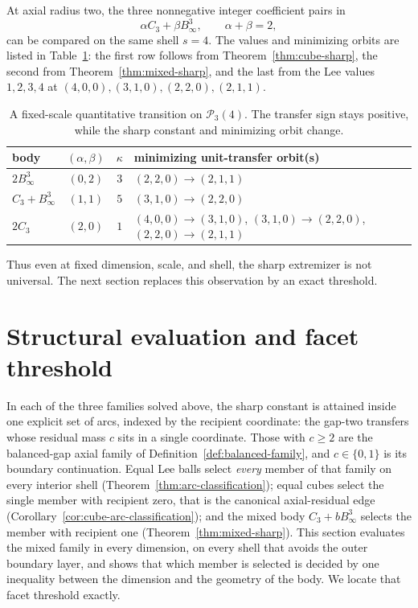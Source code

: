 \documentclass[pdflatex,sn-mathphys-num]{sn-jnl}
\theoremstyle{thmstyleone}
\theoremstyle{thmstylethree}
\theoremstyle{thmstyletwo}
\begin{document}
At axial radius two, the three nonnegative integer coefficient pairs in
\[
 \alpha C_3+\beta B_\infty^3,
 \qquad \alpha+\beta=2,
\]
can be compared on the same shell $s=4$.
The values and minimizing orbits are listed in
Table~\ref{tab:polytope-phase}: the first row follows from
Theorem~\ref{thm:cube-sharp}, the second from
Theorem~\ref{thm:mixed-sharp}, and the last from the Lee values
$1,2,3,4$ at $(4,0,0),(3,1,0),(2,2,0),(2,1,1)$.
\par
\begin{table}[ht]
\centering
\caption{A fixed-scale quantitative transition on $\mathcal P_3(4)$.  The
transfer sign stays positive, while the sharp constant and minimizing orbit
change.}
\label{tab:polytope-phase}
\small
\begin{tabular}{lccp{6.0cm}}
\toprule
body & $(\alpha,\beta)$ & $\kappa$ & minimizing unit-transfer orbit(s)\\
\midrule
$2B_\infty^3$ & $(0,2)$ & $3$ &
$(2,2,0)\to(2,1,1)$\\
$C_3+B_\infty^3$ & $(1,1)$ & $5$ &
$(3,1,0)\to(2,2,0)$\\
$2C_3$ & $(2,0)$ & $1$ &
$(4,0,0)\to(3,1,0)$,\;
$(3,1,0)\to(2,2,0)$,\;
$(2,2,0)\to(2,1,1)$\\
\bottomrule
\end{tabular}
\end{table}
Thus even at fixed dimension, scale, and shell, the sharp extremizer is not
universal.  The next section replaces this observation by an exact threshold.
\FloatBarrier

\section{Structural evaluation and facet threshold}
\label{sec:structural}

In each of the three families solved above, the sharp constant is attained
inside one explicit set of arcs, indexed by the recipient coordinate: the
gap-two transfers whose residual mass $c$ sits in a single coordinate.  Those
with $c\ge2$ are the balanced-gap axial family of
Definition~\ref{def:balanced-family}, and $c\in\{0,1\}$ is its boundary
continuation.  Equal Lee balls select
\emph{every} member of that family on every interior shell
(Theorem~\ref{thm:arc-classification}); equal cubes select the single member
with recipient zero, that is the canonical axial-residual edge
(Corollary~\ref{cor:cube-arc-classification}); and the mixed body
$C_3+bB_\infty^3$ selects the member with recipient one
(Theorem~\ref{thm:mixed-sharp}).  This section evaluates the mixed family in
every dimension, on every shell that avoids the outer boundary layer, and
shows that which member is selected is decided by one inequality between the
dimension and the geometry of the body.  We locate that facet threshold
exactly.
\end{document}
